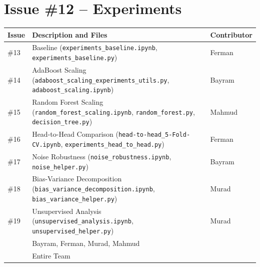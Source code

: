 \documentclass[11pt,a4paper]{article}
\begin{document}

\section*{Issue \#12 -- Experiments}

\begin{table}[H]
\centering
\small
\begin{tabular}{
  >{\RaggedRight\arraybackslash}p{1.2cm}
  >{\RaggedRight\arraybackslash}p{9.1cm}
  >{\RaggedRight\arraybackslash}p{2.7cm}
}
\toprule
\textbf{Issue}
& \textbf{Description and Files}
& \textbf{Contributor} \\
\midrule

\#13
& Baseline
  (\texttt{experiments\_baseline.ipynb},
  \texttt{experiments\_baseline.py})
& Ferman \\

\#14
& AdaBoost Scaling
  (\texttt{adaboost\_scaling\_experiments\_utils.py},
  \texttt{adaboost\_scaling.ipynb})
& Bayram \\

\#15
& Random Forest Scaling
  (\texttt{random\_forest\_scaling.ipynb},
  \texttt{random\_forest.py},
  \texttt{decision\_tree.py})
& Mahmud \\

\#16
& Head-to-Head Comparison
  (\texttt{head-to-head\_5-Fold-CV.ipynb},
  \texttt{experiments\_head\_to\_head.py})
& Ferman \\

\#17
& Noise Robustness
  (\texttt{noise\_robustness.ipynb},
  \texttt{noise\_helper.py})
& Bayram \\

\#18
& Bias-Variance Decomposition
  (\texttt{bias\_variance\_decomposition.ipynb},
  \texttt{bias\_variance\_helper.py})
& Murad \\

\#19
& Unsupervised Analysis
  (\texttt{unsupervised\_analysis.ipynb},
  \texttt{unsupervised\_helper.py})
& Murad \\

\midrule

\multicolumn{2}{l}{\textbf{Main Issue Contributors}}
& Bayram, Ferman, Murad, Mahmud \\

\multicolumn{2}{l}{\textbf{Review}}
& Entire Team \\

\bottomrule
\end{tabular}
\end{table}
\end{document}
